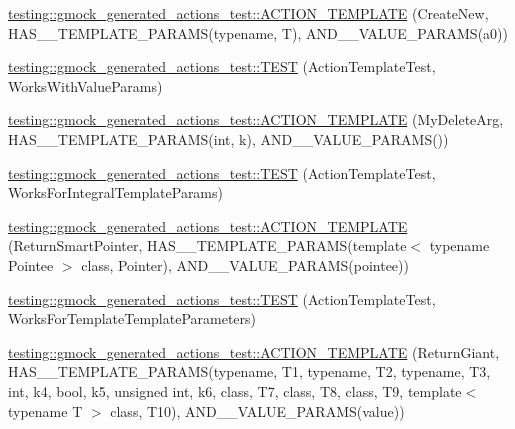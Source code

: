 \begin{DoxyCompactItemize}
\hyperlink{namespacetesting_1_1gmock__generated__actions__test_a38fb8047f95126bb0b2cfe7e670c8af7}{testing\+::gmock\+\_\+generated\+\_\+actions\+\_\+test\+::\+A\+C\+T\+I\+O\+N\+\_\+\+T\+E\+M\+P\+L\+A\+TE} (Create\+New, H\+A\+S\+\_\+\_\+\+T\+E\+M\+P\+L\+A\+T\+E\+\_\+\+P\+A\+R\+A\+MS(typename, T), A\+N\+D\+\_\+\_\+\+V\+A\+L\+U\+E\+\_\+\+P\+A\+R\+A\+MS(a0))
\item 
\hyperlink{namespacetesting_1_1gmock__generated__actions__test_a21f6e2ad5c4c1afecca93a42c9a84f1a}{testing\+::gmock\+\_\+generated\+\_\+actions\+\_\+test\+::\+T\+E\+ST} (Action\+Template\+Test, Works\+With\+Value\+Params)
\item 
\hyperlink{namespacetesting_1_1gmock__generated__actions__test_aaaac0fbf0bf2c7bd8fc104310e6af25c}{testing\+::gmock\+\_\+generated\+\_\+actions\+\_\+test\+::\+A\+C\+T\+I\+O\+N\+\_\+\+T\+E\+M\+P\+L\+A\+TE} (My\+Delete\+Arg, H\+A\+S\+\_\+\_\+\+T\+E\+M\+P\+L\+A\+T\+E\+\_\+\+P\+A\+R\+A\+MS(int, k), A\+N\+D\+\_\+\_\+\+V\+A\+L\+U\+E\+\_\+\+P\+A\+R\+A\+MS())
\item 
\hyperlink{namespacetesting_1_1gmock__generated__actions__test_aad8d77a35ac21f366dc334a45cf5b140}{testing\+::gmock\+\_\+generated\+\_\+actions\+\_\+test\+::\+T\+E\+ST} (Action\+Template\+Test, Works\+For\+Integral\+Template\+Params)
\item 
\hyperlink{namespacetesting_1_1gmock__generated__actions__test_ad99d926be507eb0c031538da2e8bb838}{testing\+::gmock\+\_\+generated\+\_\+actions\+\_\+test\+::\+A\+C\+T\+I\+O\+N\+\_\+\+T\+E\+M\+P\+L\+A\+TE} (Return\+Smart\+Pointer, H\+A\+S\+\_\+\_\+\+T\+E\+M\+P\+L\+A\+T\+E\+\_\+\+P\+A\+R\+A\+MS(template$<$ typename Pointee $>$ class, Pointer), A\+N\+D\+\_\+\_\+\+V\+A\+L\+U\+E\+\_\+\+P\+A\+R\+A\+MS(pointee))
\item 
\hyperlink{namespacetesting_1_1gmock__generated__actions__test_a8908d6badc9054adebdaf5ed8d455c2d}{testing\+::gmock\+\_\+generated\+\_\+actions\+\_\+test\+::\+T\+E\+ST} (Action\+Template\+Test, Works\+For\+Template\+Template\+Parameters)
\item 
\hyperlink{namespacetesting_1_1gmock__generated__actions__test_aea61dba8f93605f3e8c1cdedfd1079f5}{testing\+::gmock\+\_\+generated\+\_\+actions\+\_\+test\+::\+A\+C\+T\+I\+O\+N\+\_\+\+T\+E\+M\+P\+L\+A\+TE} (Return\+Giant, H\+A\+S\+\_\+\_\+\+T\+E\+M\+P\+L\+A\+T\+E\+\_\+\+P\+A\+R\+A\+MS(typename, T1, typename, T2, typename, T3, int, k4, bool, k5, unsigned int, k6, class, T7, class, T8, class, T9, template$<$ typename T $>$ class, T10), A\+N\+D\+\_\+\_\+\+V\+A\+L\+U\+E\+\_\+\+P\+A\+R\+A\+MS(value))

\end{DoxyCompactItemize}
